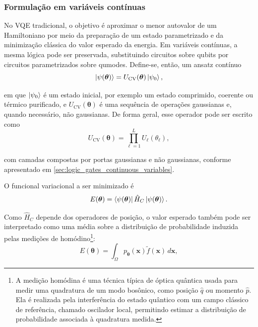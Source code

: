 \subsubsection{Formulação em variáveis contínuas}

No VQE tradicional, o objetivo é aproximar o menor autovalor de um Hamiltoniano por meio da preparação de um estado parametrizado e da minimização clássica do valor esperado da energia. Em variáveis contínuas, a mesma lógica pode ser preservada, substituindo circuitos sobre qubits por circuitos parametrizados sobre qumodes. Define-se, então, um ansatz contínuo
\begin{equation}
    \ket{\psi(\boldsymbol{\theta})}
    =
    U_{\mathrm{CV}}(\boldsymbol{\theta}) \ket{\psi_0},
    \label{eq:cv_vqe_ansatz}
\end{equation}

\noindent em que $\ket{\psi_0}$ é um estado inicial, por exemplo um estado comprimido, coerente ou térmico purificado, e $U_{\mathrm{CV}}(\boldsymbol{\theta})$ é uma sequência de operações gaussianas e, quando necessário, não gaussianas. De forma geral, esse operador pode ser escrito como
\begin{equation}
    U_{\mathrm{CV}}(\boldsymbol{\theta})
    =
    \prod_{\ell=1}^{L}
    U_{\ell}(\theta_{\ell}),
    \label{eq:cv_ansatz_layers}
\end{equation}

\noindent com camadas compostas por portas gaussianas e não gaussianas, conforme apresentado  em \autoref{sec:logic_gates_continuous_variables}.

O funcional variacional a ser minimizado é
\begin{equation}
    E(\boldsymbol{\theta})
    =
    \bra{\psi(\boldsymbol{\theta})}
    \hat{H}_C
    \ket{\psi(\boldsymbol{\theta})}.
    \label{eq:cv_vqe_energy}
\end{equation}

Como $\hat{H}_C$ depende dos operadores de posição, o valor esperado também pode ser interpretado como uma média sobre a distribuição de probabilidade induzida pelas medições de homódino\footnote{A medição homódina é uma técnica típica de óptica quântica usada para medir uma quadratura de um modo bosônico, como posição $\hat{q}$ ou momento $\hat{p}$. Ela é realizada pela interferência do estado quântico com um campo clássico de referência, chamado oscilador local, permitindo estimar a distribuição de probabilidade associada à quadratura medida.}\cite{weedbrook2012gaussian}:
\begin{equation}
    E(\boldsymbol{\theta})
    =
    \int_{\Omega}
    p_{\boldsymbol{\theta}}(\mathbf{x})
    \widetilde{f}(\mathbf{x})
    \, d\mathbf{x},
    \label{eq:cv_vqe_integral}
\end{equation}

